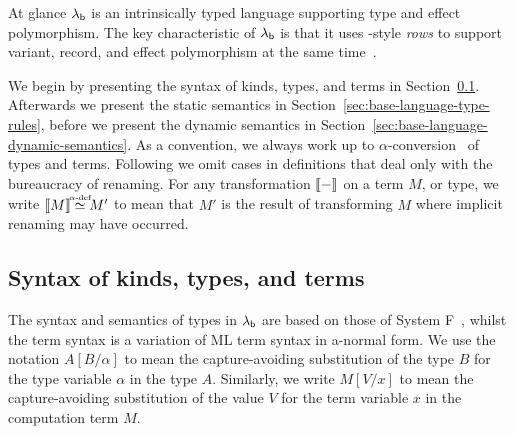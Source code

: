 \documentclass[12pt,phd,lfcs,twoside,openright,logo,leftchapter,normalheadings]{infthesis}
\theoremstyle{plain}
\theoremstyle{definition}
\begin{document}
At glance $\lambda_{\mathsf{b}}$ is an intrinsically typed language supporting type
and effect polymorphism. The key characteristic of $\lambda_{\mathsf{b}}$ is that it
uses \citeauthor{Remy94}-style \emph{rows} to support variant, record,
and effect polymorphism at the same time~\cite{Remy94}.

We begin by presenting the syntax of kinds, types, and terms in
Section~\ref{sec:syntax-base-language}. Afterwards we present the
static semantics in Section~\ref{sec:base-language-type-rules}, before
we present the dynamic semantics in
Section~\ref{sec:base-language-dynamic-semantics}. As a convention, we
always work up to $\alpha$-conversion~\cite{Church32} of types and
terms. Following \citet{Pierce02} we omit cases in definitions that
deal only with the bureaucracy of renaming. For any transformation
$\llbracket - \rrbracket$ on a term $M$, or type, we write $\sembr{M} \adef M'$ to
mean that $M'$ is the result of transforming $M$ where implicit
renaming may have occurred.

\subsection{Syntax of kinds, types, and terms}
\label{sec:syntax-base-language}

The syntax and semantics of types in $\lambda_{\mathsf{b}}$ are based on those of
System F~\cite{Girard72}, whilst the term syntax is a variation of ML
term syntax in a-normal form. We use the notation $A[B/\alpha]$ to
mean the capture-avoiding substitution of the type $B$ for the type
variable $\alpha$ in the type $A$. Similarly, we write $M[V/x]$ to
mean the capture-avoiding substitution of the value $V$ for the term
variable $x$ in the computation term $M$.
\end{document}
